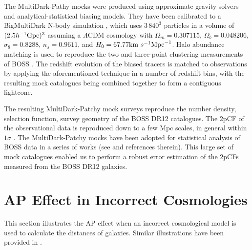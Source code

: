 \documentclass[iop]{emulateapj}
\begin{document}
The MultiDark-Pathy mocks were produced using approximate gravity solvers 
and analytical-statistical biasing models.
They have been calibrated to a BigMultiDark N-body simulation \citep{K2014}, which 
uses $3\,840^3$ particles in a volume of $(2.5h^{-1}\rm Gpc)^3$
assuming a $\Lambda$CDM cosmology with
 $\Omega_m = 0.307115$, $\Omega_b = 0.048206$, $\sigma_8 = 0.8288$, $n_s = 0.9611$, and $H_0 = 67.77 {\rm km}\ s^{-1} {\rm Mpc}^{-1}$.
Halo abundance matching is used to reproduce the two and three-point 
clustering measurements of BOSS \citep{RT2015}.
The redshift evolution of the biased tracers 
is matched to observations by applying the 
aforementioned technique in a number of redshift bins,
with the resulting mock catalogues being combined together 
to form a contiguous lightcone.

The resulting MultiDark-Patchy mock surveys reproduce the number density, 
selection function, survey geometry of the BOSS DR12 catalogues.
The 2pCF of the observational data is reproduced down to a few Mpc scales, in general within $1\sigma$ \citep{MDPATCHY}.
The MultiDark-Patchy mocks have been adopted for 
statistical analysis of BOSS data
in a series of works (see \cite{Alam2016} and references therein).
This large set of mock catalogues enabled us to perform 
a robust error estimation of the 2pCFs measured from the BOSS DR12 galaxies.



\section{AP Effect in Incorrect Cosmologies}
\label{sec:APeffect}

This section illustrates the AP effect when an incorrect cosmological model is used to calculate the distances of galaxies. Similar illustrations have been provided in \cite{Li2014,Li2015}.
\end{document}

